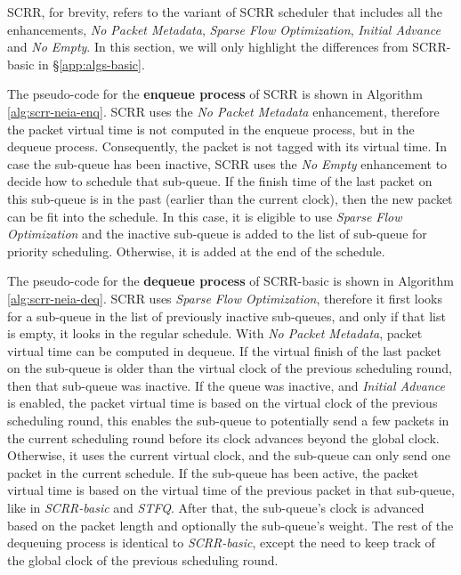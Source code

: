SCRR, for brevity, refers to the variant of SCRR scheduler that includes all the enhancements,
\textit{No Packet Metadata}, \textit{Sparse Flow Optimization},
\textit{Initial Advance} and \textit{No Empty}. In this section, we
will only highlight the differences from SCRR-basic in
\S\ref{app:algs-basic}.

The pseudo-code for the \textbf{enqueue process} of SCRR is shown in
Algorithm \ref{alg:scrr-neia-enq}. SCRR uses the \textit{No Packet
Metadata} enhancement, therefore the packet virtual time is not
computed in the enqueue process, but in the dequeue
process. Consequently, the packet is not tagged with its virtual
time. In case the sub-queue has been inactive, SCRR uses the
\textit{No Empty} enhancement to decide how to schedule that
sub-queue. If the finish time of the last packet on this sub-queue is
in the past (earlier than the current clock), then the new packet can
be fit into the schedule. In this case, it is eligible to use
\textit{Sparse Flow Optimization} and the inactive sub-queue is added
to the list of sub-queue for priority scheduling. Otherwise, it is
added at the end of the schedule.

The pseudo-code for the \textbf{dequeue process} of SCRR-basic is
shown in Algorithm \ref{alg:scrr-neia-deq}. SCRR uses \textit{Sparse
Flow Optimization}, therefore it first looks for a sub-queue in the
list of previously inactive sub-queues, and only if that list is empty,
it looks in the regular schedule. With \textit{No Packet Metadata},
packet virtual time can be computed in dequeue. If the virtual finish
of the last packet on the sub-queue is older than the virtual clock of
the previous scheduling round, then that sub-queue was inactive. If
the queue was inactive, and \textit{Initial Advance} is enabled, the
packet virtual time is based on the virtual clock of the previous
scheduling round, this enables the sub-queue to potentially send a few
packets in the current scheduling round before its clock advances
beyond the global clock. Otherwise, it uses the current virtual clock,
and the sub-queue can only send one packet in the current schedule. If
the sub-queue has been active, the packet virtual time is based on
the virtual time of the previous packet in that sub-queue, like in
\textit{SCRR-basic} and \textit{STFQ}. After that, the sub-queue's clock
is advanced based on the packet length and optionally the sub-queue's
weight. The rest of the dequeuing process is identical to
\textit{SCRR-basic}, except the need to keep track of the global clock of the previous scheduling round.

